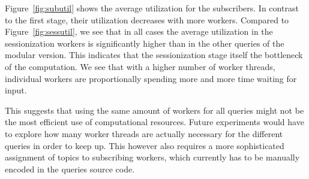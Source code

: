 Figure~\ref{fig:subutil} shows the average utilization for the subscribers. In
contrast to the first stage, their utilization decreases with more workers. 
Compared to Figure~\ref{fig:sessutil}, we see that in all cases the average utilization in the sessionization workers
is significantly higher than in the other queries of the modular version. This indicates
that the sessionization stage itself the bottleneck of the computation. 
We see that with a higher number of worker threads, individual workers are proportionally
spending more and more time waiting for input.

This suggests that using the same amount of workers for all queries might
not be the most efficient use of computational resources. Future experiments would have to
explore how many worker threads are actually necessary for the different queries
in order to keep up. This however also requires a more sophisticated assignment of
topics to subscribing workers, which currently has to be manually encoded in
the queries source code.

